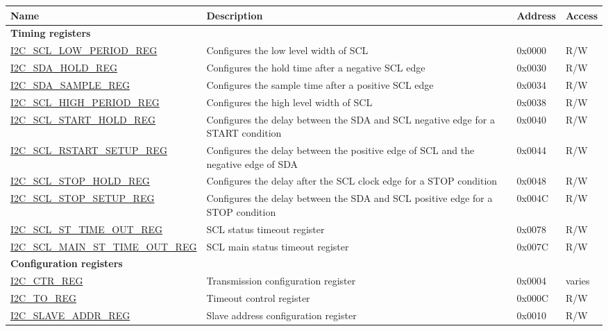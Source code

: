 \begin{longtable}{  | m{5.7cm} | m{7cm} | m{1.3cm} | m{1.5cm} | }
\hline\rowcolor{lightgray}
Name & Description &  Address & Access \\ \hline
\endhead
\multicolumn{4}{|l|}{\textbf{Timing registers}} \\ \hline
\hyperref[regdesc:I2CSCLLOWPERIODREG]{I2C\_SCL\_LOW\_PERIOD\_REG} & Configures the low level width of SCL & 0x0000 & R/W \\ \hline
\hyperref[regdesc:I2CSDAHOLDREG]{I2C\_SDA\_HOLD\_REG} & Configures the hold time after a negative SCL edge & 0x0030 & R/W \\ \hline
\hyperref[regdesc:I2CSDASAMPLEREG]{I2C\_SDA\_SAMPLE\_REG} & Configures the sample time after a positive SCL edge & 0x0034 & R/W \\ \hline
\hyperref[regdesc:I2CSCLHIGHPERIODREG]{I2C\_SCL\_HIGH\_PERIOD\_REG} & Configures the high level width of SCL & 0x0038 & R/W \\ \hline
\hyperref[regdesc:I2CSCLSTARTHOLDREG]{I2C\_SCL\_START\_HOLD\_REG} & Configures the delay between the SDA and SCL negative edge for a START condition & 0x0040 & R/W \\ \hline
\hyperref[regdesc:I2CSCLRSTARTSETUPREG]{I2C\_SCL\_RSTART\_SETUP\_REG} & Configures the delay between the positive edge of SCL and the negative edge of SDA & 0x0044 & R/W \\ \hline
\hyperref[regdesc:I2CSCLSTOPHOLDREG]{I2C\_SCL\_STOP\_HOLD\_REG} & Configures the delay after the SCL clock edge for a STOP condition & 0x0048 & R/W \\ \hline
\hyperref[regdesc:I2CSCLSTOPSETUPREG]{I2C\_SCL\_STOP\_SETUP\_REG} & Configures the delay between the SDA and SCL positive edge for a STOP condition & 0x004C & R/W \\ \hline
\hyperref[regdesc:I2CSCLSTTIMEOUTREG]{I2C\_SCL\_ST\_TIME\_OUT\_REG} & SCL status timeout register & 0x0078 & R/W \\ \hline
\hyperref[regdesc:I2CSCLMAINSTTIMEOUTREG]{I2C\_SCL\_MAIN\_ST\_TIME\_OUT\_REG} & SCL main status timeout register & 0x007C & R/W \\ \hline
\multicolumn{4}{|l|}{\textbf{Configuration registers}} \\ \hline
\hyperref[regdesc:I2CCTRREG]{I2C\_CTR\_REG} & Transmission configuration register & 0x0004 & varies \\ \hline
\hyperref[regdesc:I2CTOREG]{I2C\_TO\_REG} & Timeout control register & 0x000C & R/W \\ \hline
\hyperref[regdesc:I2CSLAVEADDRREG]{I2C\_SLAVE\_ADDR\_REG} & Slave address configuration register & 0x0010 & R/W \\ \hline

\end{longtable}
